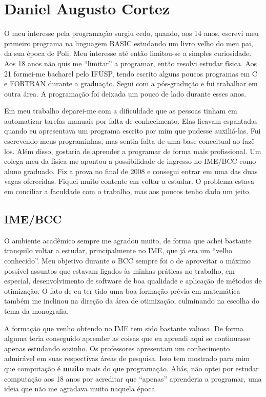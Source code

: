 \section{Daniel Augusto Cortez}
\label{sec:daniel_subjetiva}

O meu interesse pela programação surgiu cedo, quando, aos 14 anos, escrevi meu primeiro programa na
linguagem BASIC estudando um livro velho do meu pai, da sua época de Poli. Meu interesse até então
limitou-se a simples curiosidade. Aos 18 anos não quis me ``limitar'' a programar, então resolvi
estudar física. Aos 21 formei-me bacharel pelo IFUSP, tendo escrito alguns poucos programas em C e
FORTRAN durante a graduação. Segui com a pós-gradução e fui trabalhar em outra área. A programação
foi deixada um pouco de lado durante esses anos.

Em meu trabalho deparei-me com a dificuldade que as pessoas tinham em automatizar tarefas manuais
por falta de conhecimento. Elas ficavam espantadas quando eu apresentava um programa escrito por mim
que pudesse auxiliá-las. Fui escrevendo meus programinhas, mas sentia falta de uma base conceitual
ao fazê-los. Além disso, gostaria de aprender a programar de forma mais profissional. Um colega meu
da física me apontou a possibilidade de ingresso no IME/BCC como aluno graduado. Fiz a prova no
final de 2008 e consegui entrar em uma das duas vagas oferecidas. Fiquei muito contente em voltar a
estudar. O problema estava em conciliar a faculdade com o trabalho, mas aos poucos tenho dado um
jeito.

\subsection{IME/BCC}

O ambiente acadêmico sempre me agradou muito, de forma que achei bastante tranquilo voltar a
estudar, principalmente no IME, que já era um ``velho conhecido''. Meu objetivo durante o BCC sempre
foi o de aproveitar o máximo possível assuntos que estavam ligados às minhas práticas no trabalho,
em especial, desenvolvimento de software de boa qualidade e aplicação de métodos de otimização. O
fato de eu ter tido uma boa formação prévia em matemática também me inclinou na direção da área de 
otimização, culminando na escolha do tema da monografia.

A formação que venho obtendo no IME tem sido bastante valiosa. De forma alguma teria conseguido
aprender as coisas que eu aprendi aqui se continuasse apenas estudando sozinho. Os professores
apresentam um conhecimento admirável em suas respectivas áreas de pesquisa. Isso tem mostrado para
mim que computação é {\bf muito} mais do que programação. Aliás, não optei por estudar computação
aos 18 anos por acreditar que ``apenas'' aprenderia a programar, uma ideia que não me agradava muito
naquela época.

